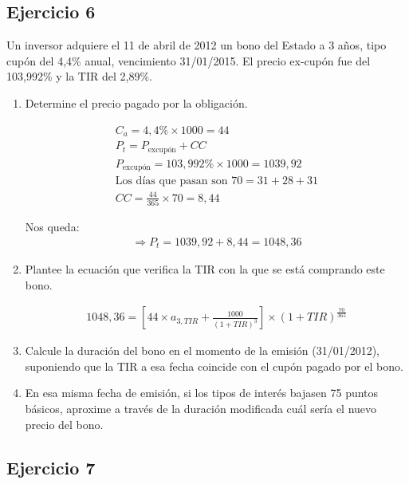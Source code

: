 \subsection*{Ejercicio 6}

Un inversor adquiere el 11 de abril de 2012 un bono del Estado a 3 años, tipo cupón del 4,4\% anual, vencimiento 31/01/2015. El precio ex-cupón fue del 103,992\% y la TIR del 2,89\%.

\begin{enumerate}[label=\textbf{\alph*)}]
    \item Determine el precio pagado por la obligación.
    
    \begin{align*}
        C_a = 4,4\% \times 1000 = 44 \\
        P_t = P_{\text{excupón}} + CC \\
        P_{\text{excupón}} = 103,992\% \times 1000 = 1039,92 \\
        \text{Los días que pasan son } 70 = 31 + 28 + 31 \\
        CC = \frac{44}{365} \times 70 = 8,44
    \end{align*}

    Nos queda:
    \begin{align*}
        \Rightarrow P_t = 1039,92 + 8,44 = 1048,36
    \end{align*}

    \item Plantee la ecuación que verifica la TIR con la que se está comprando este bono.
    
    \begin{align*}
        1048,36 = \left[44 \times a_{3, TIR} + \frac{1000}{(1+TIR)^3}\right] \times (1+TIR)^{\frac{70}{365}}
    \end{align*}

    \item Calcule la duración del bono en el momento de la emisión (31/01/2012), suponiendo que la TIR a esa fecha coincide con el cupón pagado por el bono.
    \item En esa misma fecha de emisión, si los tipos de interés bajasen 75 puntos básicos, aproxime a través de la duración modificada cuál sería el nuevo precio del bono.
\end{enumerate}



\subsection*{Ejercicio 7 }

